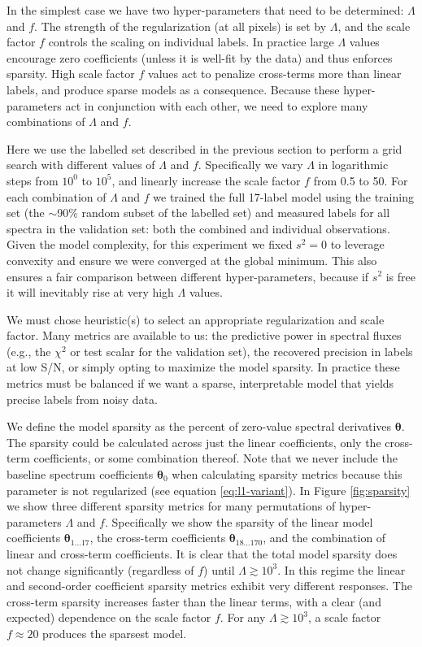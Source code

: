 \documentclass[12pt,preprint]{aastex}
\newcommand{\Dvector}[1]{\boldsymbol{#1}}
\newcommand{\vectheta}{\Dvector{\theta}}
\begin{document}
In the simplest case we have two hyper-parameters that need to be determined: 
$\Lambda$ and $f$.  The strength of the regularization (at all pixels) is set 
by $\Lambda$, and the scale factor $f$ controls the scaling on individual 
labels.  In practice large $\Lambda$ values encourage zero coefficients (unless
it is well-fit by the data) and thus enforces sparsity.  High scale factor $f$
values act to penalize cross-terms more than linear labels, and produce sparse
models as a consequence.  Because these hyper-parameters act in conjunction 
with each other, we need to explore many combinations of $\Lambda$ and $f$.


Here we use the labelled set described in the previous section to perform a
grid search with different values of $\Lambda$ and $f$.  Specifically we vary 
$\Lambda$ in logarithmic steps from $10^0$ to $10^5$, and linearly increase the 
scale factor $f$ from 0.5 to 50.  For each combination of $\Lambda$ and $f$ we 
trained the full 17-label model using the training set (the $\sim$90\% random
subset of the labelled set) and measured labels for all spectra in the
validation set: both the combined and individual observations.  Given the model
complexity, for this experiment we fixed $s^2 = 0$ to leverage convexity
and ensure we were converged at the global minimum.  This also ensures a fair
comparison between different hyper-parameters, because if $s^2$ is free it
will inevitably rise at very high $\Lambda$ values.  


We must chose heuristic(s) to select an appropriate regularization and scale
factor.  Many metrics are available to us: the predictive power in spectral
fluxes (e.g., the $\chi^2$ or test scalar for the validation set), the 
recovered precision in labels at low S/N, or simply opting to maximize the 
model sparsity.  In practice these metrics must be balanced if we want a 
sparse, interpretable model that yields precise labels from noisy data.


We define the model sparsity as the percent of zero-value spectral derivatives 
$\vectheta$.  The sparsity could be calculated across just the linear 
coefficients, only the cross-term coefficients, or some combination thereof.  
Note that we never include the baseline spectrum coefficients $\vectheta_0$ when 
calculating sparsity metrics because this parameter is not regularized (see 
equation \ref{eq:l1-variant}).  In Figure \ref{fig:sparsity} we show three 
different sparsity metrics for many permutations of hyper-parameters $\Lambda$ 
and $f$.  Specifically we show the sparsity of the linear model coefficients 
$\vectheta_{1...17}$, the cross-term coefficients $\vectheta_{18...170}$, and 
the combination of linear and cross-term coefficients.  It is clear that the 
total model sparsity does not change significantly (regardless of $f$) until 
$\Lambda \gtrsim 10^3$.  In this regime the linear and second-order coefficient 
sparsity metrics exhibit very different responses.  The cross-term sparsity 
increases faster than the linear terms, with a clear (and expected) dependence 
on the scale factor $f$.  For any $\Lambda \gtrsim 10^3$, a scale factor 
$f \approx 20$ produces the sparsest model.
\end{document}
